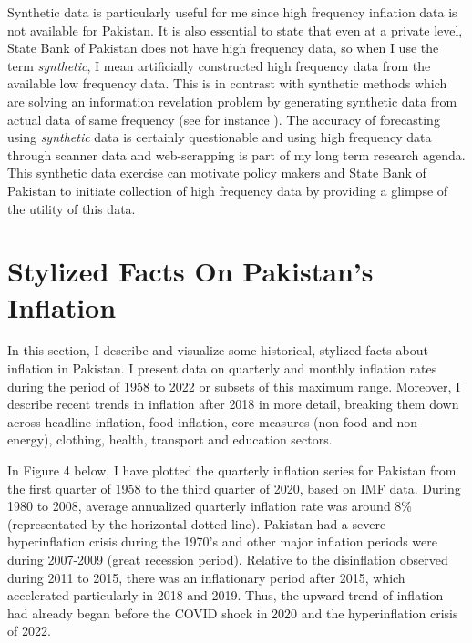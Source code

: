 \documentclass[12pt]{article}
\newcommand{\1}{\mathbbm 1}
\begin{document}
		Synthetic data is particularly useful for me since high frequency inflation data is not available for Pakistan. It is also essential to state that even at a private level, State Bank of Pakistan does not have high frequency data, so when I use the term \textit{synthetic}, I mean artificially constructed high frequency data from the available low frequency data. This is in contrast with synthetic methods which are solving an information revelation problem by generating synthetic data from actual data of same frequency (see for instance \cite{patki2016synthetic}). The accuracy of forecasting using \textit{synthetic} data is certainly questionable and using high frequency data through scanner data and web-scrapping is part of my long term research agenda. This synthetic data exercise can motivate policy makers and State Bank of Pakistan to initiate collection of high frequency data by providing a glimpse of the utility of this data.
		
		
		
		
		
		
		
		
		
		
		
		
		\section{Stylized Facts On Pakistan's Inflation}
		
		In this section, I describe and visualize some historical, stylized facts about inflation in Pakistan. I present data on quarterly and monthly inflation rates during the period of 1958 to 2022 or subsets of this maximum range. Moreover, I describe recent trends in inflation after 2018 in more detail, breaking them down across headline inflation, food inflation, core measures (non-food and non-energy), clothing, health, transport and education sectors.
		
		In Figure 4 below, I have plotted the quarterly inflation series for Pakistan from the first quarter of 1958 to the third quarter of 2020, based on IMF data. During 1980 to 2008, average annualized quarterly inflation rate was around 8\% (representated by the horizontal dotted line). Pakistan had a severe hyperinflation crisis during the 1970's and other major inflation periods were during 2007-2009 (great recession period). Relative to the disinflation observed during 2011 to 2015, there was an inflationary period after 2015, which accelerated particularly in 2018 and 2019. Thus, the upward trend of inflation had already began before the COVID shock in 2020 and the hyperinflation crisis of 2022.
		
\end{document}

